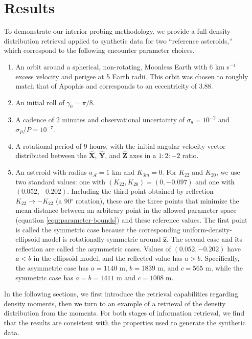 \documentclass[fleqn,usenatbib]{mnras}
\renewcommand{\unit}[1]{\bm{\hat{#1}}}
\begin{document}
\section{Results}
\label{sec:results}

To demonstrate our interior-probing methodology, we provide a full density distribution retrieval applied to synthetic data for two ``reference asteroids,'' which correspond to the following encounter parameter choices.

\begin{enumerate}
  \item An orbit around a spherical, non-rotating, Moonless Earth with $6$ km s$^{-1}$ excess velocity and perigee at 5 Earth radii. This orbit was chosen to roughly match that of Apophis and corresponds to an eccentricity of 3.88. 
  \item An initial roll of $\gamma_0=\pi/8$.
  \item A cadence of 2 minutes and observational uncertainty of $\sigma_\theta = 10^{-2}$ and $\sigma_P / P = 10^{-7}$.
  \item A rotational period of 9 hours, with the initial angular velocity vector distributed between the $\unit X$, $\unit Y$, and $\unit Z$ axes in a $1:2:-2$ ratio.
  \item An asteroid with radius $a_\mathcal{A} = 1$ km and $K_{3m}=0$. For $K_{22}$ and $K_{20}$, we use two standard values: one with $(K_{22}, K_{20}) = (0, -0.097)$ and one with $(0.052, -0.202)$. Including the third point obtained by reflection $K_{22}\rightarrow -K_{22}$ (a 90$^\circ$ rotation), these are the three points that minimize the mean distance between an arbitrary point in the allowed parameter space (equation \ref{eqn:parameter-bounds}) and these reference values. The first point is called the symmetric case because the corresponding uniform-density-ellipsoid model is rotationally symmetric around $\unit z$. The second case and its reflection are called the asymmetric cases. Values of $(0.052, -0.202)$ have $a < b$ in the ellipsoid model, and the reflected value has $a > b$. Specifically, the asymmetric case has $a=1140$ m, $b=1839$ m, and $c=565$ m, while the symmetric case has $a=b=1411$ m and $c=1008$ m.
\end{enumerate}

In the following sections, we first introduce the retrieval capabilities regarding density moments, then we turn to an example of a retrieval of the density distribution from the moments. For both stages of information retrieval, we find that the results are consistent with the properties used to generate the synthetic data.
\end{document}
